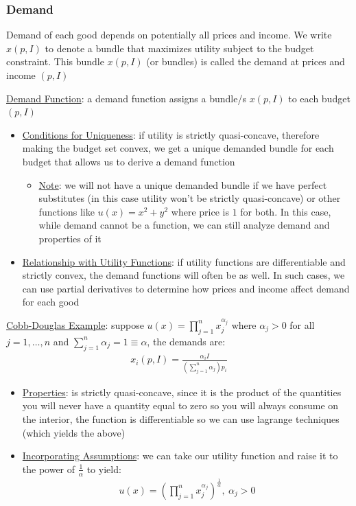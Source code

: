 \documentclass{article}
\begin{document}
\subsubsection{Demand}
Demand of each good depends on potentially all prices and income. We write $x(p,I)$ to denote a bundle that maximizes utility subject to the budget constraint. This bundle $x(p,I)$ (or bundles) is called the demand at prices and income $(p, I)$  \par \vspace{0.3em}
  \underline{Demand Function}: a demand function assigns a bundle/s $x(p, I)$ to each budget $(p,I)$
  \begin{itemize}
    \item  \underline{Conditions for Uniqueness}: if utility is strictly quasi-concave, therefore making the budget set convex, we get a unique demanded bundle for each budget that allows us to derive a demand function
    \begin{itemize}
      \item  \underline{Note}: we will not have a unique demanded bundle if we have perfect substitutes (in this case utility won't be strictly quasi-concave) or other functions like $u(x) = x^{2} + y^{2}$ where price is $1$ for both. In this case, while demand cannot be a function, we can still analyze demand and properties of it
    \end{itemize}
    \item  \underline{Relationship with Utility Functions}: if utility functions are differentiable and strictly convex, the demand functions will often be as well. In such cases, we can use partial derivatives to determine how prices and income affect demand for each good
  \end{itemize}
  \par
  \underline{Cobb-Douglas Example}: suppose $u(x) = \prod_{j=1}^{n} x_{j}^{\alpha_{j}}$ where $\alpha_{j} > 0$ for all $j = 1, \dots, n$ and $\sum_{j=1}^{n} \alpha_{j} = 1 \equiv \alpha$, the demands are:
  \begin{gather*}
    x_{i}(p,I) = \frac{\alpha_{i} I}{(\sum_{j=1}^{n}\alpha_{j})p_{i}}
  \end{gather*}
  \par
  \begin{itemize}
    \item  \underline{Properties}: is strictly quasi-concave, since it is the product of the quantities you will never have a quantity equal to zero so you will always consume on the interior, the function is differentiable so we can use lagrange techniques (which yields the above)
    \item  \underline{Incorporating Assumptions}: we can take our utility function and raise it to the power of $\tfrac{1}{\alpha}$ to yield:
    \begin{gather*}
      u(x) = (\prod_{j=1}^{n} x_{j}^{\alpha_{j}})^{\tfrac{1}{\alpha}}, \ \alpha_{j} > 0
    \end{gather*}
  \end{itemize}
\end{document}
